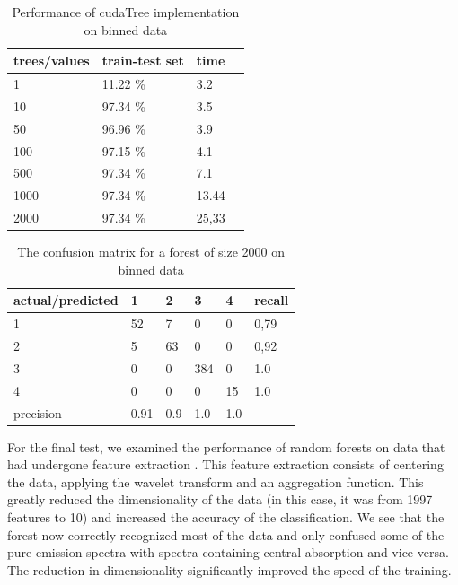 \documentclass[thesis=B,english]{FITthesis}[2012/10/20]
\begin{document}
\begin{table}[h]
\begin{tabular}{|l|l|l|l|}
\hline
trees/values & train-test set & time\\ \hline
1&11.22    \%&3.2\\ \hline
10&97.34   \%&3.5\\ \hline
50&96.96   \%&3.9\\ \hline
100&97.15  \%&4.1\\ \hline
500&97.34  \%&7.1\\ \hline
1000&97.34 \%&13.44\\ \hline
2000&97.34 \%&25,33\\ \hline 
\end{tabular}
\caption{Performance of cudaTree implementation on binned data}
\label{tab:cuda-binned}
\end{table}
\begin{table}[h]
\begin{tabular}{|l|l|l|l|l|l|}
\hline
actual/predicted & 1 & 2 & 3 & 4 & recall \\ \hline
1 & 52 & 7 & 0 & 0 & 0,79 \\ \hline
2 & 5 & 63 & 0 & 0 & 0,92 \\ \hline
3 & 0 & 0 & 384 & 0 & 1.0 \\ \hline
4 & 0 & 0 & 0 & 15 & 1.0 \\ \hline
precision & 0.91 & 0.9 & 1.0 & 1.0 &  \\ \hline
\end{tabular}
\caption{The confusion matrix for a forest of size 2000 on binned data}
\label{tab:confbinned}
\end{table}
For the final test, we examined the performance of random forests on data that had undergone feature extraction \cite{bromovabeclass}. This feature extraction consists of centering the data, applying the wavelet transform and an aggregation function. This greatly reduced the dimensionality of the data (in this case, it was from 1997 features to 10) and increased the accuracy of the classification. We see that the forest now correctly recognized most of the data and only confused some of the pure emission spectra with spectra containing central absorption and vice-versa. The reduction in dimensionality significantly improved the speed of the training.
\end{document}
